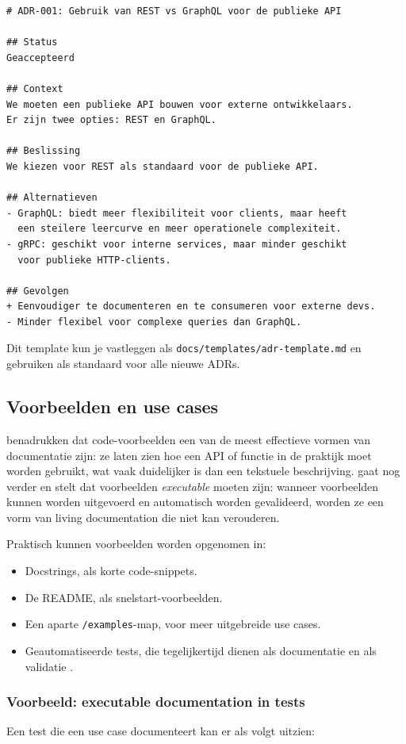 \begin{verbatim}
# ADR-001: Gebruik van REST vs GraphQL voor de publieke API

## Status
Geaccepteerd

## Context
We moeten een publieke API bouwen voor externe ontwikkelaars.
Er zijn twee opties: REST en GraphQL.

## Beslissing
We kiezen voor REST als standaard voor de publieke API.

## Alternatieven
- GraphQL: biedt meer flexibiliteit voor clients, maar heeft
  een steilere leercurve en meer operationele complexiteit.
- gRPC: geschikt voor interne services, maar minder geschikt
  voor publieke HTTP-clients.

## Gevolgen
+ Eenvoudiger te documenteren en te consumeren voor externe devs.
- Minder flexibel voor complexe queries dan GraphQL.
\end{verbatim}

Dit template kun je vastleggen als \texttt{docs/templates/adr-template.md} en gebruiken als standaard voor alle nieuwe ADRs.

\subsection{Voorbeelden en use cases}
\textcite{bhatti2021docsdevelopers} benadrukken dat code-voorbeelden een van de meest effectieve vormen van documentatie zijn: ze laten zien hoe een API of functie in de praktijk moet worden gebruikt, wat vaak duidelijker is dan een tekstuele beschrijving. \textcite{martraire2019livingdocumentation} gaat nog verder en stelt dat voorbeelden \textit{executable} moeten zijn: wanneer voorbeelden kunnen worden uitgevoerd en automatisch worden gevalideerd, worden ze een vorm van living documentation die niet kan verouderen.

Praktisch kunnen voorbeelden worden opgenomen in:
\begin{itemize}
    \item Docstrings, als korte code-snippets.
    \item De README, als snelstart-voorbeelden.
    \item Een aparte \texttt{/examples}-map, voor meer uitgebreide use cases.
    \item Geautomatiseerde tests, die tegelijkertijd dienen als documentatie en als validatie \autocite{martraire2019livingdocumentation}.
\end{itemize}

\subsubsection{Voorbeeld: executable documentation in tests}
Een test die een use case documenteert kan er als volgt uitzien:

